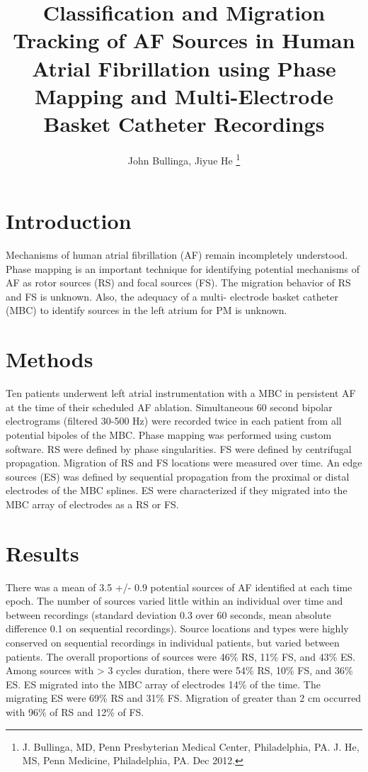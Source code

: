 \documentclass[journal,onecolumn]{IEEEtran} %
\begin{document}
\title{Classification and Migration Tracking of AF Sources in Human Atrial Fibrillation using Phase Mapping and Multi-Electrode Basket Catheter Recordings}

\author{John Bullinga, Jiyue He
\thanks{J. Bullinga, MD, Penn Presbyterian Medical Center, Philadelphia, PA. J. He, MS, Penn Medicine, Philadelphia, PA. Dec 2012.}}

\maketitle

\section{Introduction}
Mechanisms of human atrial fibrillation (AF) remain incompletely understood. Phase
mapping is an important technique for identifying potential mechanisms of AF as rotor sources (RS) and
focal sources (FS). The migration behavior of RS and FS is unknown. Also, the adequacy of a multi-
electrode basket catheter (MBC) to identify sources in the left atrium for PM is unknown.

\section{Methods}
Ten patients underwent left atrial instrumentation with a MBC in persistent AF at the time of their scheduled AF ablation. Simultaneous 60 second bipolar electrograms (filtered 30-500 Hz) were recorded twice in each patient from all potential bipoles of the MBC. Phase mapping was performed using custom software. RS were defined by phase singularities. FS were defined by centrifugal propagation. Migration of RS and FS locations were measured over time. An edge sources (ES) was defined by sequential propagation from the proximal or distal electrodes of the MBC splines. ES were characterized if they migrated into the MBC array of electrodes as a RS or FS.

\section{Results}
There was a mean of 3.5 +/- 0.9 potential sources of AF identified at each time epoch. The number of sources varied little within an individual over time and between recordings (standard deviation 0.3 over 60 seconds, mean absolute difference 0.1 on sequential recordings). Source locations and types were highly conserved on sequential recordings in individual patients, but varied between patients. The overall proportions of sources were 46\% RS, 11\% FS, and 43\% ES. Among sources with > 3 cycles duration, there were 54\% RS, 10\% FS, and 36\% ES. ES migrated into the MBC array of electrodes 14\% of the time. The migrating ES were 69\% RS and 31\% FS. Migration of greater than 2 cm occurred with 96\% of RS and 12\% of FS.
\end{document}

